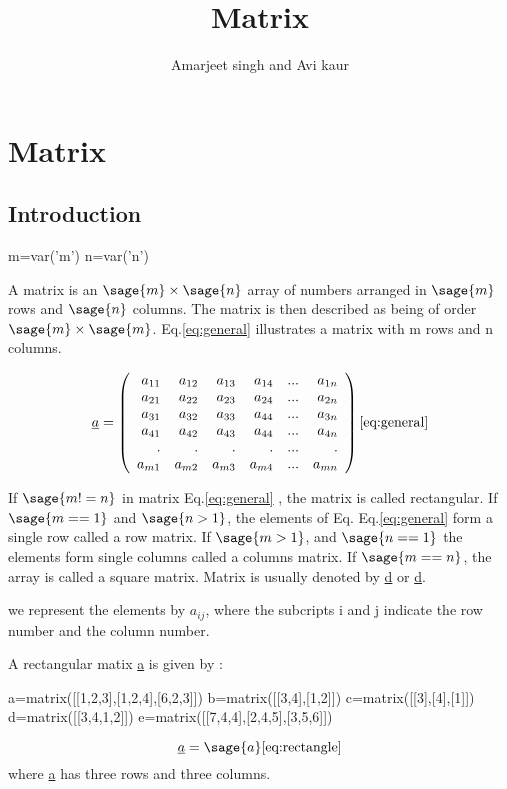 \documentclass[12pt]{report}
\title{\textbf{Matrix}}
\author{Amarjeet singh and Avi kaur}
\newcommand{\lab}[1]{
Eq.\ref{#1}
}
\begin{document}
\begin{titlepage}
\maketitle
\end{titlepage}
\chapter{Matrix}
\section{Introduction}
\begin{sagesilent}
m=var('m')
n=var('n')
\end{sagesilent}

A matrix is an $\sage{m} \times \sage{n}$  array of numbers arranged in $\sage{m}$ rows and $\sage{n}$ columns. The matrix is then described as being of order $\sage{m} \times \sage{m}$. \lab{eq:general} illustrates a matrix with m rows and n columns.



\[\underline{a}=\left(\begin{array}{rrrrrr}
a_{11} & a_{12} & a_{13} & a_{14} & ... & a_{1n} \\
a_{21} & a_{22} & a_{23} & a_{24} & ... & a_{2n} \\
a_{31} & a_{32} & a_{33} & a_{44} & ... & a_{3n} \\
a_{41} & a_{42} & a_{43} & a_{44} & ... & a_{4n} \\
.     & .     & .     & .     & ... & .     \\
a_{m1} & a_{m2} & a_{m3} & a_{m4} & ... & a_{mn} \\
\end{array}\right) \label{eq:general}             \ref{eq:general} 
 \] 

If $\sage{m!=n}$ in matrix \lab{eq:general}, the matrix is called rectangular. If $\sage{m==1}$ and $\sage{n>1}$, the elements of Eq.\lab{eq:general} form a single row called a row matrix. If $\sage{m>1}$, and $\sage{n==1}$ the elements form single columns called a columns matrix. If $\sage{m==n}$, the array is called a square matrix.
Matrix is usually denoted by \underline{d} or \underline{d}.

we represent the elements by $a_{{ij}}$, where the subcripts i and j indicate the row number and the column number.

A rectangular matix \underline{a} is given by : 
\begin{sagesilent}
a=matrix([[1,2,3],[1,2,4],[6,2,3]])
b=matrix([[3,4],[1,2]])
c=matrix([[3],[4],[1]])
d=matrix([[3,4,1,2]])
e=matrix([[7,4,4],[2,4,5],[3,5,6]])
\end{sagesilent}
$$
\underline{a}=\sage{a}
\label{eq:rectangle}
\ref{eq:rectangle}
$$
where \underline{a} has three rows and three columns.
\end{document}
